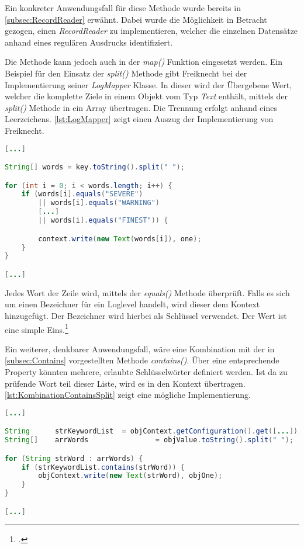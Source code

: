 Ein konkreter Anwendungsfall für diese Methode wurde bereits in \autoref{subsec:RecordReader} erwähnt. Dabei wurde die Möglichkeit in Betracht gezogen, einen \textit{RecordReader} zu implementieren, welcher die einzelnen Datensätze anhand eines regulären Ausdrucks identifiziert.

Die Methode kann jedoch auch in der \textit{map()} Funktion eingesetzt werden. Ein Beispiel für den Einsatz der \textit{split()} Methode gibt Freiknecht bei der Implementierung seiner \textit{LogMapper} Klasse. In dieser wird der Übergebene Wert, welcher die komplette Ziele in einem Objekt vom Typ \textit{Text} enthält, mittels der \textit{split()} Methode in ein Array übertragen. Die Trennung erfolgt anhand eines Leerzeichens. \autoref{lst:LogMapper} zeigt einen Auszug der Implementierung von Freiknecht. \\

\begin{lstlisting}[language=Java,caption=Auszug der \textit{map()} Methode der Klasse \textit{LogMapper}, title=\autoref*{lst:LogMapper}: Auszug der \textit{map()} Methode der Klasse \textit{LogMapper}\protect\footnotemark,label=lst:LogMapper]
[...]

String[] words = key.toString().split(" ");

for (int i = 0; i < words.length; i++) {
	if (words[i].equals("SEVERE")
		|| words[i].equals("WARNING")
		[...]
		|| words[i].equals("FINEST")) {

		context.write(new Text(words[i]), one);
	}
}

[...]
\end{lstlisting}

Jedes Wort der Zeile wird, mittels der \textit{equals()} Methode überprüft. Falls es sich um einen Bezeichner für ein Loglevel handelt, wird dieser dem Kontext hinzugefügt. Der Bezeichner wird hierbei als Schlüssel verwendet. Der Wert ist eine simple Eins.\footcite[Vgl.][S. 121 f.]{Freiknecht.2014}

Ein weiterer, denkbarer Anwendungsfall, wäre eine Kombination mit der in \autoref{subsec:Contains} vorgestellten Methode \textit{contains()}. Über eine entsprechende Property könnten mehrere, erlaubte Schlüsselwörter definiert werden. Ist da zu prüfende Wort teil dieser Liste, wird es in den Kontext übertragen. \autoref{lst:KombinationContainsSplit} zeigt eine mögliche Implementierung. \\

\begin{lstlisting}[language=Java,caption=Kombination von \textit{contains()} und \textit{split()},label=lst:KombinationContainsSplit]
[...]

String		strKeywordList	= objContext.getConfiguration().get([...]);
String[]	arrWords 				= objValue.toString().split(" ");

for (String strWord : arrWords) {
	if (strKeywordList.contains(strWord)) {
		objContext.write(new Text(strWord), objOne);
	}
}

[...]
\end{lstlisting}

